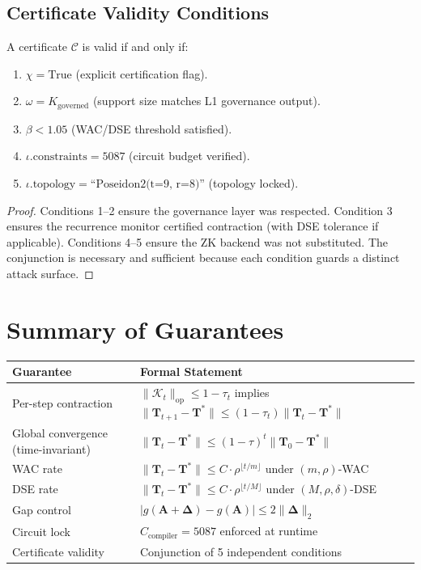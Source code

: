 \documentclass[11pt]{article}
\begin{document}
\subsection{Certificate Validity Conditions}

\begin{theorem}
A certificate $\mathcal{C}$ is valid if and only if:
\begin{enumerate}
\item $\chi = \text{True}$ (explicit certification flag).
\item $\omega = K_{\text{governed}}$ (support size matches L1 governance output).
\item $\beta < 1.05$ (WAC/DSE threshold satisfied).
\item $\iota.\text{constraints} = 5087$ (circuit budget verified).
\item $\iota.\text{topology} = \text{``Poseidon2(t=9, r=8)''}$ (topology locked).
\end{enumerate}
\end{theorem}

\begin{proof}
Conditions 1--2 ensure the governance layer was respected. Condition 3 ensures the recurrence monitor certified contraction (with DSE tolerance if applicable). Conditions 4--5 ensure the ZK backend was not substituted. The conjunction is necessary and sufficient because each condition guards a distinct attack surface.
\end{proof}

\section{Summary of Guarantees}

\begin{longtable}{p{} p{}}
\toprule
\textbf{Guarantee} & \textbf{Formal Statement} \\
\midrule
Per-step contraction & $\|\mathcal{K}_t\|_{\mathrm{op}} \leq 1 - \tau_t$ implies $\|\mathbf{T}_{t+1} - \mathbf{T}^*\| \leq (1 - \tau_t)\|\mathbf{T}_t - \mathbf{T}^*\|$ \\
Global convergence (time-invariant) & $\|\mathbf{T}_t - \mathbf{T}^*\| \leq (1 - \tau)^t \|\mathbf{T}_0 - \mathbf{T}^*\|$ \\
WAC rate & $\|\mathbf{T}_t - \mathbf{T}^*\| \leq C \cdot \rho^{\lfloor t/m \rfloor}$ under $(m, \rho)$-WAC \\
DSE rate & $\|\mathbf{T}_t - \mathbf{T}^*\| \leq C \cdot \rho^{\lfloor t/M \rfloor}$ under $(M, \rho, \delta)$-DSE \\
Gap control & $|g(\mathbf{A} + \boldsymbol{\Delta}) - g(\mathbf{A})| \leq 2\|\boldsymbol{\Delta}\|_2$ \\
Circuit lock & $C_{\text{compiler}} = 5087$ enforced at runtime \\
Certificate validity & Conjunction of 5 independent conditions \\
\bottomrule
\end{longtable}
\end{document}
